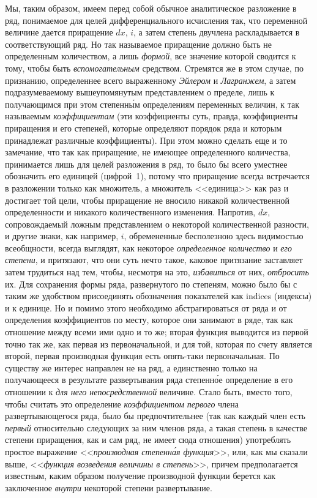 Мы, таким образом, имеем перед собой обычное аналитическое разложение в ряд,
понимаемое для целей дифференциального исчисления так, что переменной величине
дается приращение $dx$, $i$, а затем степень двучлена раскладывается в
соответствующий ряд. Но так называемое приращение должно быть не определенным
количеством, а лишь {\em формой}, все значение которой сводится к тому, чтобы
быть {\em вспомогательным} средством. Стремятся же в этом случае, по признанию,
определеннее всего выраженному {\em Эйлером} и {\em Лагранжем}, а затем
подразумеваемому вышеупомянутым представлением о пределе, лишь к получающимся
при этом степенн\'{ы}м определениям переменных величин, к так называемым
{\em коэффициентам} (эти коэффициенты суть, правда, коэффициенты приращения и
его степеней, которые определяют порядок ряда и которым принадлежат различные
коэффициенты). При этом можно сделать еще и то замечание, что так как
приращение, не имеющее определенного количества, принимается лишь для целей
разложения в ряд, то было бы всего уместнее обозначить его единицей (цифрой~1),
потому что приращение всегда встречается в разложении только как множитель, а
множитель <<единица>> как раз и достигает той цели, чтобы приращение не вносило
никакой количественной определенности и никакого количественного изменения.
Напротив, $dx$, сопровождаемый ложным представлением о некоторой количественной
разности, и другие знаки, как например, $i$, обремененные бесполезною здесь
видимостью всеобщности, всегда выглядят, как некоторое
{\em определенное количество} и {\em его степени}, и притязают, что они суть
нечто такое, каковое притязание заставляет затем трудиться над тем, чтобы,
несмотря на это, {\em избавиться} от них, {\em отбросить} их. Для сохранения
формы ряда, развернутого по степеням, можно было бы с таким же удобством
присоединять обозначения показателей как indices (индексы) и к единице. Но и
помимо этого необходимо абстрагироваться от ряда и от определения коэффициентов
по месту, которое они занимают в ряде, так как отношение между всеми ими одно и
то же; вторая функция выводится из первой точно так же, как первая из
первоначальной, и для той, которая по счету является второй, первая производная
функция есть опять-таки первоначальная. По существу же интерес направлен не на
ряд, а единственно только на получающееся в результате развертывания ряда
степенн\'{о}е определение в его отношении к {\em для него непосредственной}
величине. Стало быть, вместо того, чтобы считать это определение
{\em коэффициентом первого} члена развертывающегося ряда, было бы
предпочтительнее (так как каждый член есть {\em первый} относительно следующих
за ним членов ряда, а такая степень в качестве степени приращения, как и сам
ряд, не имеет сюда отношения) употреблять простое выражение <<{\em производная
степенн\'{а}я функция}>>, или, как мы сказали выше, <<{\em функция возведения
величины в степень}>>, причем предполагается известным, каким образом получение
производной функции берется как заключенное {\em внутри} некоторой степени
развертывание.

